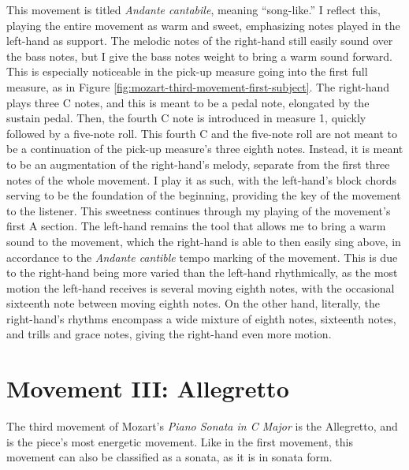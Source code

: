 This movement is titled \textit{Andante cantabile}, meaning ``song-like.'' I reflect this, playing the entire movement as warm and sweet, emphasizing notes played in the left-hand as support. The melodic notes of the right-hand still easily sound over the bass notes, but I give the bass notes weight to bring a warm sound forward. This is especially noticeable in the pick-up measure going into the first full measure, as in Figure \ref{fig:mozart-third-movement-first-subject}. The right-hand plays three C notes, and this is meant to be a pedal note, elongated by the sustain pedal. Then, the fourth C note is introduced in measure 1, quickly followed by a five-note roll. This fourth C and the five-note roll are not meant to be a continuation of the pick-up measure's three eighth notes. Instead, it is meant to be an augmentation of the right-hand's melody, separate from the first three notes of the whole movement. I play it as such, with the left-hand's block chords serving to be the foundation of the beginning, providing the key of the movement to the listener. This sweetness continues through my playing of the movement's first A section. The left-hand remains the tool that allows me to bring a warm sound to the movement, which the right-hand is able to then easily sing above, in accordance to the \textit{Andante cantible} tempo marking of the movement. This is due to the right-hand being more varied than the left-hand rhythmically, as the most motion the left-hand receives is several moving eighth notes, with the occasional sixteenth note between moving eighth notes. On the other hand, literally, the right-hand's rhythms encompass a wide mixture of eighth notes, sixteenth notes, and trills and grace notes, giving the right-hand even more motion. %

\section{Movement III: Allegretto}
The third movement of Mozart's \textit{Piano Sonata in C Major} is the Allegretto, and is the piece's most energetic movement. Like in the first movement, this movement can also be classified as a sonata, as it is in sonata form. 

